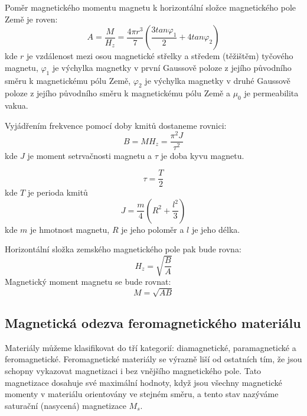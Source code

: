 \documentclass[a4paper,11pt]{article}
\begin{document}
    \begin{minipage}[t]{0.5\textwidth} 
            Poměr magnetického momentu magnetu k horizontální složce magnetického pole Země je roven: 
            \begin{equation}
                A = \frac{M}{H_z} = \frac{4 \pi r^3}{7} \left( \frac{3 tan\varphi_1}{2} +4 tan\varphi_2 \right)
            \end{equation}
            kde $r$ je vzdálenost mezi osou magnetické střelky a středem (těžištěm) tyčového magnetu, $\varphi_1$ je výchylka magnetky v první Gaussově poloze z jejího původního směru k magnetickému pólu Země, $\varphi_2$ je výchylka magnetky v druhé Gaussově poloze z jejího původního směru k magnetickému pólu Země a $\mu_0$ je permeabilita vakua.
            \vspace{10pt}
            \par Vyjádřením frekvence pomocí doby kmitů dostaneme rovnici:
            \begin{equation}
                B = MH_z = \frac{\pi^2 J}{\tau^2}
            \end{equation}
            kde $J$ je moment setrvačnosti magnetu a $\tau$ je doba kyvu magnetu.

            \begin{equation}
                \tau = \frac{T}{2}
            \end{equation}
            kde $T$ je perioda kmitů
            \begin{equation}
                J = \frac{m}{4} \left( R^2 + \frac{l^2}{3} \right)
            \end{equation}
            kde $m$ je hmotnost magnetu, $R$ je jeho poloměr a $l$ je jeho délka.
            \vspace{10pt}
            \par Horizontální složka zemského magnetického pole pak bude rovna: 
            \begin{equation}
                H_z = \sqrt{\frac{B}{A}}
            \end{equation}
            Magnetický moment magnetu se bude rovnat:
            \begin{equation}
                M = \sqrt{AB}
            \end{equation}
        \subsection{Magnetická odezva feromagnetického materiálu}
            Materiály můžeme klasifikovat do tří kategorií: diamagnetické, paramagnetické a feromagnetické. Feromagnetické materiály se výrazně liší od ostatních tím, že jsou schopny vykazovat magnetizaci i bez vnějšího magnetického pole. Tato magnetizace dosahuje své maximální hodnoty, když jsou všechny magnetické momenty v materiálu orientovány ve stejném směru, a tento stav nazýváme saturační (nasycená) magnetizace $M_s$. 
    \end{minipage}
\end{document}
